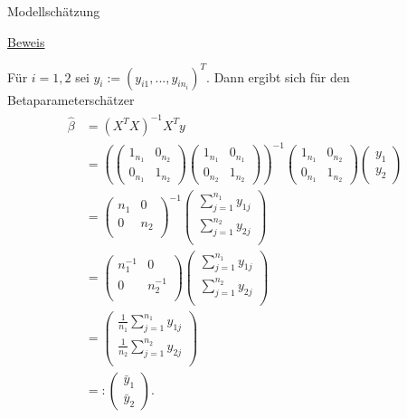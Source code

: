 \documentclass[
  8pt,
  ignorenonframetext,
]{beamer}
\begin{document}
\begin{frame}{Modellschätzung}
\protect\hypertarget{modellschuxe4tzung-3}{}
\footnotesize

\underline{Beweis}

Für \(i = 1,2\) sei \(y_i := (y_{i1},...,y_{in_i})^T\). Dann ergibt sich
für den Betaparameterschätzer \begin{align}
\begin{split}
\hat{\beta}
& = (X^{T}X)^{-1}X^{T}y
\\
& = \left(
\begin{pmatrix} 1_{n_1} & 0_{n_2} \\ 0_{n_1} & 1_{n_2} \end{pmatrix}
\begin{pmatrix} 1_{n_1} & 0_{n_1} \\ 0_{n_2} & 1_{n_2} \end{pmatrix}
\right)^{-1}
\begin{pmatrix} 1_{n_1} & 0_{n_2} \\ 0_{n_1} & 1_{n_2} \end{pmatrix}
\begin{pmatrix} y_1 \\ y_2 \end{pmatrix}
\\
& =
\begin{pmatrix}
n_1     & 0     \\
0       & n_2   \\
\end{pmatrix}^{-1}
\begin{pmatrix}
\sum_{j=1}^{n_1} y_{1j} \\
\sum_{j=1}^{n_2} y_{2j} \\
\end{pmatrix}
\\
& = \begin{pmatrix}
n_1^{-1}    & 0         \\
0           & n_2^{-1}  \\
\end{pmatrix}
\begin{pmatrix}
\sum_{j=1}^{n_1} y_{1j} \\
\sum_{j=1}^{n_2} y_{2j} \\
\end{pmatrix} \\
& =\begin{pmatrix}
\frac{1}{n_1}\sum_{j=1}^{n_1} y_{1j} \\
\frac{1}{n_2}\sum_{j=1}^{n_2} y_{2j} \\
\end{pmatrix}
\\
& =: \begin{pmatrix} \bar{y}_1 \\  \bar{y}_2 \end{pmatrix}.
\end{split}
\end{align}
\end{frame}
\end{document}
